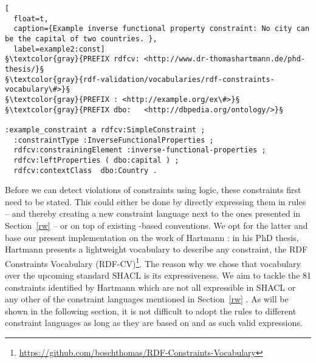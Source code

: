 \begin{lstlisting}[
  float=t,
  caption={Example inverse functional property constraint: No city can be the capital of two countries. },
  label=example2:const]
§\textcolor{gray}{PREFIX rdfcv: <http://www.dr-thomashartmann.de/phd-thesis/}§
§\textcolor{gray}{rdf-validation/vocabularies/rdf-constraints-vocabulary\#>}§
§\textcolor{gray}{PREFIX : <http://example.org/ex\#>}§
§\textcolor{gray}{PREFIX dbo: 	<http://dbpedia.org/ontology/>}§

:example_constraint a rdfcv:SimpleConstraint ;
  :constraintType :InverseFunctionalProperties ;
  rdfcv:constrainingElement :inverse-functional-properties ;
  rdfcv:leftProperties ( dbo:capital ) ;
  rdfcv:contextClass  dbo:Country .
\end{lstlisting}

Before we can detect violations of constraints using \nthree logic,
these constraints first need to be stated.
This could either be done by directly expressing them in 
rules -- and thereby creating
a new constraint language next to the ones presented in Section~\ref{rw} -- or on top of existing \rdf-based conventions. 
We opt for the latter and base our present implementation on the work of Hartmann \cite[p.167 ff]{hartmann2016}:
in his PhD thesis, Hartmann presents a lightweight vocabulary to describe any constraint, 
the RDF Constraints Vocabulary (RDF-CV)\footnote{\url{https://github.com/boschthomas/RDF-Constraints-Vocabulary}}. The reason why we chose that vocabulary over 
the upcoming standard
SHACL is its expressiveness. We aim to tackle the 81 constraints identified by Hartmann which are not all expressible in SHACL 
or any other of the constraint languages
mentioned in Section~\ref{rw} \cite[p.52, appendix]{hartmann2016}. As will be shown in the following section, it is not difficult to adopt the rules to different 
constraint languages as long as they are based on \rdf and as such valid \nthree expressions.

